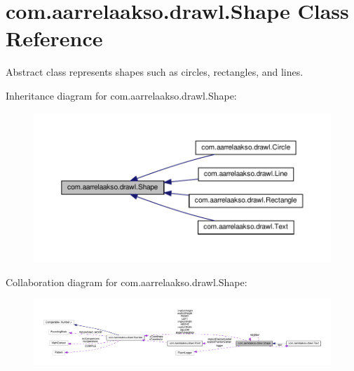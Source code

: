 \hypertarget{classcom_1_1aarrelaakso_1_1drawl_1_1_shape}{}\section{com.\+aarrelaakso.\+drawl.\+Shape Class Reference}
\label{classcom_1_1aarrelaakso_1_1drawl_1_1_shape}


Abstract class represents shapes such as circles, rectangles, and lines.  




Inheritance diagram for com.\+aarrelaakso.\+drawl.\+Shape\+:\nopagebreak
\begin{figure}[H]
\begin{center}
\leavevmode
\includegraphics[width=350pt]{d1/d7f/classcom_1_1aarrelaakso_1_1drawl_1_1_shape__inherit__graph}
\end{center}
\end{figure}


Collaboration diagram for com.\+aarrelaakso.\+drawl.\+Shape\+:
\nopagebreak
\begin{figure}[H]
\begin{center}
\leavevmode
\includegraphics[width=350pt]{d7/d06/classcom_1_1aarrelaakso_1_1drawl_1_1_shape__coll__graph}
\end{center}
\end{figure}
